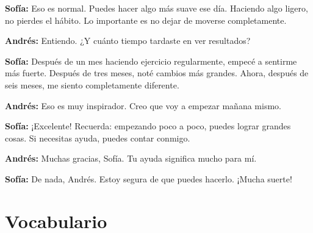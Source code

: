 \documentclass[12pt,a4paper]{article}
\begin{document}
\textbf{Sofía:} Eso es normal. Puedes hacer algo más suave ese día. Haciendo algo ligero, no pierdes el hábito. Lo importante es no dejar de moverse completamente.

\textbf{Andrés:} Entiendo. ¿Y cuánto tiempo tardaste en ver resultados?

\textbf{Sofía:} Después de un mes haciendo ejercicio regularmente, empecé a sentirme más fuerte. Después de tres meses, noté cambios más grandes. Ahora, después de seis meses, me siento completamente diferente.

\textbf{Andrés:} Eso es muy inspirador. Creo que voy a empezar mañana mismo.

\textbf{Sofía:} ¡Excelente! Recuerda: empezando poco a poco, puedes lograr grandes cosas. Si necesitas ayuda, puedes contar conmigo.

\textbf{Andrés:} Muchas gracias, Sofía. Tu ayuda significa mucho para mí.

\textbf{Sofía:} De nada, Andrés. Estoy segura de que puedes hacerlo. ¡Mucha suerte!

\newpage

\section*{Vocabulario}
\end{document}
